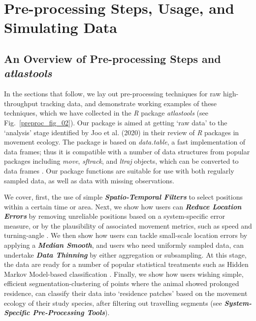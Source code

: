     \section*{Pre-processing Steps, Usage, and Simulating Data}

    \subsection*{An Overview of Pre-processing Steps and \textit{atlastools}}

    In the sections that follow, we lay out pre-processing techniques for raw high-throughput tracking data, and demonstrate working examples of these techniques, which we have collected in the \textit{R} package \textit{atlastools} (see Fig.~\ref{preproc_fig_02}).
    Our package is aimed at getting `raw data' to the `analysis' stage identified by Joo et al. (2020) in their review of \textit{R} packages in movement ecology.
    The package is based on \textit{data.table}, a fast implementation of data frames; thus it is compatible with a number of data structures from popular packages including \textit{move}, \textit{sftrack}, and \textit{ltraj} objects, which can be converted to data frames \citep[][]{kranstauber2011,boone2020,calenge2009}.
    Our package functions are suitable for use with both regularly sampled data, as well as data with missing observations.

    We cover, first, the use of simple \textit{\textbf{Spatio-Temporal Filters}} to select positions within a certain time or area.
    Next, we show how users can \textit{\textbf{Reduce Location Errors}} by removing unreliable positions based on a system-specific error measure, or by the plausibility of associated movement metrics, such as speed and turning-angle \citep{seidel2018, calenge2009}.
    We then show how users can tackle small-scale location errors by applying a \textit{\textbf{Median Smooth}}, and users who need uniformly sampled data, can undertake \textit{\textbf{Data Thinning}} by either aggregation or subsampling.
    At this stage, the data are ready for a number of popular statistical treatments such as Hidden Markov Model-based classification \citep{michelot2016,langrock2012}.
    Finally, we show how users wishing simple, efficient segmentation-clustering of points where the animal showed prolonged residence, can classify their data into `residence patches' \citep{barraquand2008, bijleveld2016} based on the movement ecology of their study species, after filtering out travelling segments (see \textit{\textbf{System-Specific Pre-Processing Tools}}).

